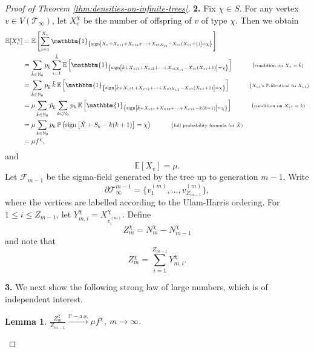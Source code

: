 \documentclass[11pt]{article}
\numberwithin{equation}{section}
\theoremstyle{plain}
\newtheorem{lemma}[theorem]{Lemma}
\newcommand{\N}{\mathbb N}
\newcommand{\EE}{\mathbb E}
\newcommand{\PP}{\mathbb{P}}
\newcommand{\Tt}{\mathcal{T}}
\newcommand{\tX}{\tilde{X}}
\newcommand{\tk}{\tilde{k}}
\newcommand{\ind}[1]{\mathbbm{1}_{\left\{#1\right\}}}
\begin{document}
\begin{proof}[Proof of Theorem \ref{thm:densities-on-infinite-trees}]
\medskip\noindent
{\bf 2.}
Fix $\chi \in S$. For any vertex $v\in V(\Tt_\infty)$, let $X_v^\chi$ be the number of offspring of $v$ of type $\chi$. Then  we obtain 
\begin{align*}
\EE[X_v^\chi] &= \EE\left[\sum_{i=1}^{X_v}\ind{{\rm sign}\left[X_v+X_{vi1}+X_{vi2}
+\cdots+X_{viX_{vi}}-X_{vi}(X_{vi}+1)\right]=\chi}\right]\\
&= \sum_{\tk\in\N_0} p_{\tk} \sum_{i=1}^{\tk}\EE\left[\ind{{\rm sign}
\left[\tk+X_{vi1}+X_{vi2}+\cdots+X_{viX_{vi}}-X_{vi}(X_{vi}+1)\right]
=\chi}\right]\quad\tag{\scriptsize condition on $X_v=\tk$}\\
&= \sum_{\tk\in\N_0} p_{\tk}\,\tk\,  \EE\left[\ind{{\rm sign}\left[\tk+X_{v11}+X_{v12}
+\cdots+X_{v1X_{v1}}-X_{v1}(X_{v1}+1)\right]=\chi}\right]\quad\tag{\scriptsize $X_{vi}$'s $\PP$-identical to $X_{v1}$}\\
&=\mu \sum_{\tk\in\N_0} \tilde{p}_{\tk}\sum_{k\in\N_0} p_k\, \EE\left[\ind{{\rm sign}
\left[\tk+X_{v11}+X_{v12}+\cdots+X_{v1k}-k(k+1)\right]=\chi}\right]\quad\tag{\scriptsize condition on $X_{v1}=k$}\\
&= \mu\sum_{k\in\N_0} p_k\, \PP\left({\rm sign}\left[\tilde{X} + S_k-k(k+1)\right]
=\chi\right)\quad\tag{\scriptsize full probability formula for $\tX$}\\
&= \mu f^\chi,
\end{align*}
and
\[
\EE[X_v] = \mu.
\]
Let $\mathcal{F}_{m-1}$ be the sigma-field generated by the tree up to generation $m-1$. Write
\[
\partial \mathcal{T}_{\infty}^{m-1} = \{v_1^{(m)} , \ldots , v_{Z_{m-1}}^{(m)}\},
\]
where the vertices are labelled according to the Ulam-Harris ordering. For $1\leq i\leq Z_{m-1}$, let $Y_{m,i}^{\chi}=X_{v_{i}^{(m)}}^\chi$. Define
\[
Z_m^\chi = N_m^\chi-N_{m-1}^\chi 
\]
and note that
\[
Z_m^\chi = \sum_{i=1}^{Z_{m-1}} Y_{m,i}^{\chi}.
\]

\medskip\noindent
{\bf 3.}
We next show the following strong law of large numbers, which is of independent interest.

\begin{lemma}
\label{lem:randomindexSLLN}
$\frac{Z_m^\chi}{Z_{m-1}} \stackrel{\PP-\mathrm{a.s.}}{\longrightarrow} \mu f^\chi$, $m\to \infty$.
\end{lemma}


\end{proof}
\end{document}
